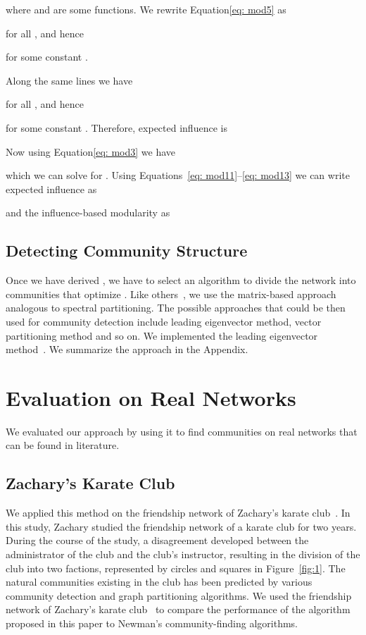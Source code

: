 \documentclass{sig-alternate}
\newcommand{\figref}[1]{Figure~\ref{#1}}
\begin{document}
where  and  are some functions. We rewrite Equation\eqref{eq: mod5}  as

for all , and hence

for some constant .

Along the same lines we have

for all , and hence

for some constant . Therefore, expected influence is 

Now using Equation\eqref{eq: mod3} we have

which we can solve for .
Using Equations~\ref{eq: mod11}--\ref{eq: mod13} we can write expected influence as

and the influence-based modularity as
 

\subsection{Detecting Community Structure}
Once we have derived , we have to select an algorithm to divide the network into communities that optimize . Like others~\cite{ Newman206,Newman106,Leicht}, we  use the matrix-based approach analogous to spectral  partitioning. The possible approaches that could be then used for community detection include leading eigenvector method, vector partitioning method and so on. We implemented the leading eigenvector method~\cite{Newman206}.
We summarize the approach in the Appendix.


\section{Evaluation on Real Networks}
\label{sec:evaluation}

We evaluated our approach by using it to find communities on real networks that can be found in literature.

\subsection{Zachary's Karate Club}



We applied this method on the friendship network of Zachary's karate club~\cite{Zachary}. In this study, Zachary studied the friendship network of a karate club for two years. During the course of the study, a disagreement developed between the administrator of the club and the club's instructor, resulting in the division of the club into two factions, represented by circles and  squares in \figref{fig:1}. The natural communities existing in the club has been predicted by various community detection and graph partitioning algorithms.
We used the friendship network of Zachary's karate club~\cite{Zachary} to compare the performance of the algorithm  proposed in this paper to Newman's community-finding algorithms. 
\end{document}
